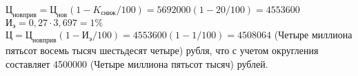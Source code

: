 \noindent $ \text{Ц}_\text{новприв} = \text{Ц}_\text{нов}(1-K_\text{сниж}/100)= 5692000(1-20/100) = 4553600  $\\
\noindent $ \text{И}_\text{э} = 0,27\cdot3,697 = 1 \%  $\\
$ \text{Ц} = \text{Ц}_\text{новприв}(1-\text{И}_\text{э}/100) = 4553600(1-1/100) = 4508064 $ (Четыре миллиона пятьсот восемь тысяч шестьдесят четыре) рубля, что с учетом округления составляет 4500000 (Четыре миллиона пятьсот  тысяч) рублей.






%
